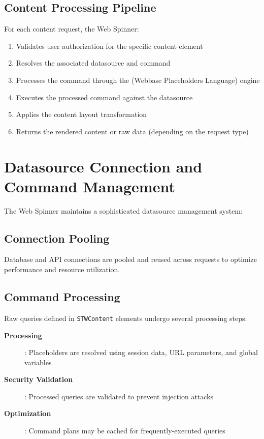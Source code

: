 \subsection{Content Processing Pipeline}

For each content request, the Web Spinner:
\begin{enumerate}
	\item Validates user authorization for the specific content element
	\item Resolves the associated datasource and command
	\item Processes the command through the \wbpl{} (Webbase Placeholders Language) engine
	\item Executes the processed command against the datasource
	\item Applies the content layout transformation
	\item Returns the rendered content or raw data (depending on the request type)
\end{enumerate}

\section{Datasource Connection and Command Management}
\label{sec:datasource-management}

The Web Spinner maintains a sophisticated datasource management system:

\subsection{Connection Pooling}

Database and API connections are pooled and reused across requests to optimize performance and resource utilization.

\subsection{Command Processing}

Raw queries defined in \texttt{STWContent} elements undergo several processing steps:

\begin{description}
	\item[\textbf{\wbpl{} Processing}]: Placeholders are resolved using session data, URL parameters, and global variables
	\item[\textbf{Security Validation}]: Processed queries are validated to prevent injection attacks
	\item[\textbf{Optimization}]: Command plans may be cached for frequently-executed queries
\end{description}

